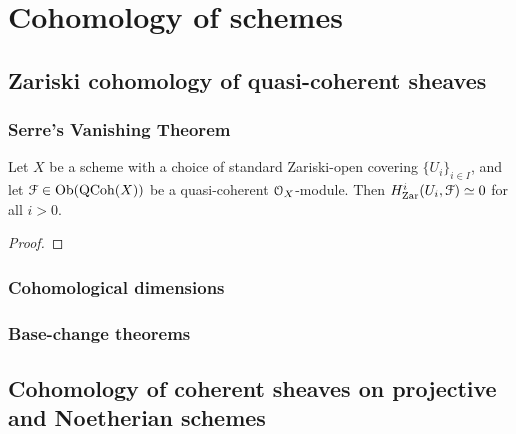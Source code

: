 \section{Cohomology of schemes}
    \subsection{Zariski cohomology of quasi-coherent sheaves}
        \subsubsection{Serre's Vanishing Theorem}
            \begin{lemma} \label{lemma: serre_vanishing_on_standard_open_subsets}
                Let $X$ be a scheme with a choice of standard Zariski-open covering $\{U_i\}_{i \in I}$, and let $\mathcal{F} \in \mathrm{Ob}(\mathrm{QCoh}(X))$ be a quasi-coherent $\mathcal{O}_X$-module. Then $H^i_{\mathrm{Zar}}(U_i, \mathcal{F}) \simeq 0$ for all $i > 0$.
            \end{lemma}
                \begin{proof}
                    
                \end{proof}
        
        \subsubsection{Cohomological dimensions}
        
        \subsubsection{Base-change theorems}
        
    \subsection{Cohomology of coherent sheaves on projective and Noetherian schemes}